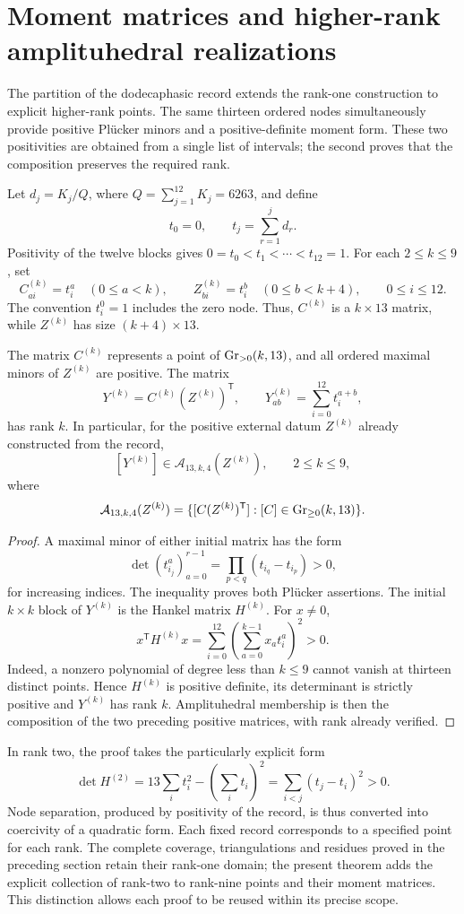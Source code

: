 \section{Moment matrices and higher-rank amplituhedral realizations}
\label{sec:higher-rank}
The partition of the dodecaphasic record extends the rank-one
construction to explicit higher-rank points. The same thirteen
ordered nodes simultaneously provide positive Plücker minors
and a positive-definite moment form. These two positivities are
obtained from a single list of intervals; the second proves that the
composition preserves the required rank.

Let \(d_j=K_j/Q\), where \(Q=\sum_{j=1}^{12}K_j=6263\), and define
\[
 t_0=0,\qquad t_j=\sum_{r=1}^jd_r.
\]
Positivity of the twelve blocks gives
\(0=t_0<t_1<\cdots<t_{12}=1\). For each \(2\le k\le9\), set
\[
 C^{(k)}_{ai}=t_i^a\quad(0\le a<k),\qquad
 Z^{(k)}_{bi}=t_i^b\quad(0\le b<k+4),\qquad 0\le i\le12.
\]
The convention \(t_i^0=1\) includes the zero node. Thus, \(C^{(k)}\)
is a \(k\times13\) matrix, while \(Z^{(k)}\) has
size \((k+4)\times13\).

\begin{theorem}
The matrix \(C^{(k)}\) represents a point of
\(\operatorname{Gr}_{>0}(k,13)\), and all ordered maximal minors of
\(Z^{(k)}\) are positive. The matrix
\[
 Y^{(k)}=C^{(k)}(Z^{(k)})^{\mathsf T},\qquad
 Y^{(k)}_{ab}=\sum_{i=0}^{12}t_i^{a+b},
\]
has rank \(k\). In particular, for the positive external datum
\(Z^{(k)}\) already constructed from the record,
\[
 [Y^{(k)}]\in\mathcal A_{13,k,4}(Z^{(k)}),\qquad 2\le k\le9,
\]
where
\[
 \mathcal A_{13,k,4}(Z^{(k)})
 =\{[C(Z^{(k)})^{\mathsf T}]:[C]\in\operatorname{Gr}_{\ge0}(k,13)\}.
\]
\end{theorem}
\begin{proof}
A maximal minor of either initial matrix has the form
\[
 \det(t_{i_j}^{a})_{a=0}^{r-1}
 =\prod_{p<q}(t_{i_q}-t_{i_p})>0,
\]
for increasing indices. The inequality proves both Plücker
assertions. The initial \(k\times k\) block of \(Y^{(k)}\) is the
Hankel matrix \(H^{(k)}\). For \(x\ne0\),
\[
 x^{\mathsf T}H^{(k)}x
 =\sum_{i=0}^{12}\left(\sum_{a=0}^{k-1}x_at_i^a\right)^2>0.
\]
Indeed, a nonzero polynomial of degree less than \(k\le9\) cannot
vanish at thirteen distinct points. Hence \(H^{(k)}\) is positive definite,
its determinant is strictly positive and \(Y^{(k)}\) has rank
\(k\). Amplituhedral membership is then the composition of the
two preceding positive matrices, with rank already verified.
\end{proof}

In rank two, the proof takes the particularly explicit form
\[
 \det H^{(2)}=13\sum_i t_i^2-\left(\sum_i t_i\right)^2
 =\sum_{i<j}(t_j-t_i)^2>0.
\]
Node separation, produced by positivity of the record,
is thus converted into coercivity of a quadratic form. Each
fixed record corresponds to a specified point for each rank. The
complete coverage, triangulations and residues proved in the
preceding section retain their rank-one domain; the present theorem
adds the explicit collection of rank-two to rank-nine points and their moment
matrices. This distinction allows each proof to be reused within its
precise scope.
